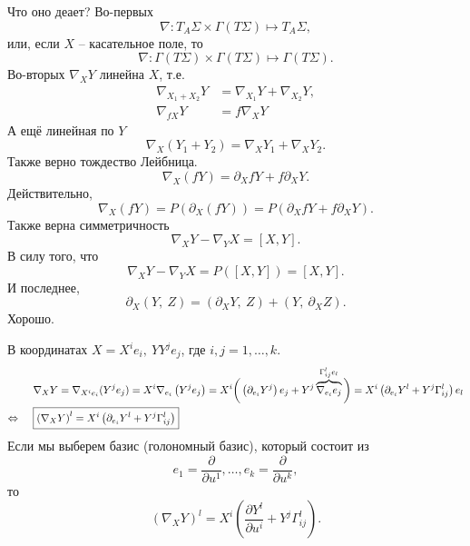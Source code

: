 Что оно деает? Во-первых
\begin{equation*}
    \nabla \colon T_A \Sigma \times \Gamma (T \Sigma) \mapsto T_A \Sigma,
\end{equation*}
или, если $X$ -- касательное поле, то
\begin{equation*}
    \nabla \colon \Gamma(T \Sigma) \times \Gamma(T \Sigma) \mapsto 
    \Gamma(T \Sigma).
\end{equation*}
Во-вторых $\nabla_X Y$ линейна $X$, т.е. 
\begin{align*}
    \nabla_{X_1 + X_2} Y &= \nabla_{X_1} Y + \nabla_{X_2} Y,\\
    \nabla_{fX} Y &= f \nabla_X Y
\end{align*}
А ещё линейная по $Y$ 
\begin{equation*}
    \nabla_X (Y_1 + Y_2) = \nabla_X Y_1 + \nabla_X Y_2.
\end{equation*}
Также верно тождество Лейбница.
\begin{equation}
    \nabla_X (fY) = \partial_X f Y + f \partial_X Y.
\end{equation}
Действительно,
\begin{equation*}
    \nabla_X (fY) = P(\partial_X (fY)) = P (\partial_X f Y + f \partial_X Y).
\end{equation*}
Также верна симметричность
\begin{equation}
    \nabla_X Y - \nabla_Y X = \left[X, Y\right].
\end{equation}
В силу того, что
\begin{equation*}
    \nabla_X Y - \nabla_Y X = 
    P([X, Y]) = [X, Y].
\end{equation*}
И последнее,
\begin{equation*}
    \partial_X \left(Y,\ Z\right) = \left(\partial_X Y,\ Z \right)
    + \left(Y,\ \partial_X Z\right).
\end{equation*}
Хорошо.

В координатах $X = X^i e_i, \ Y Y^j e_j$, где $i, j = 1, \ldots, k$.
\vspace{-5mm}
\begin{align*}
    &\nabla_X Y = \nabla_{X^ie_i} (Y^j e_j) = X^i \nabla_{e_i} \left(Y^j e_j\right) 
    =
     X^i \bigg (
        \left(\partial_{e_i} Y^j\right)e_j + 
        Y^j \overbrace{\nabla_{e_i} e_j}^{
            \Gamma_{ij}^{l} e_l
        }
    \bigg)
    = 
    X^i \left(
        \partial_{e_i} Y^l + Y^j \Gamma_{ij}^{l} 
    \right) e_l \\
    \Leftrightarrow \hspace{0.5cm} 
    &\boxed{
        \left(\nabla_X Y\right)^l = X^i \left(\partial_{e_i} Y^l + Y^j \Gamma_{ij}^{l} \right)
    }
\end{align*}
Если мы выберем базис (голономный базис), который состоит из
\begin{equation*}
    e_1 = \frac{\partial }{\partial u^1} , \ldots, e_k = \frac{\partial }{\partial u^k},
\end{equation*}
то
\begin{equation*}
    \left(\nabla_X Y\right)^l = X^i \left(\frac{\partial Y^l}{\partial u^i}  + Y^j \Gamma_{ij}^{l} \right).
\end{equation*}


